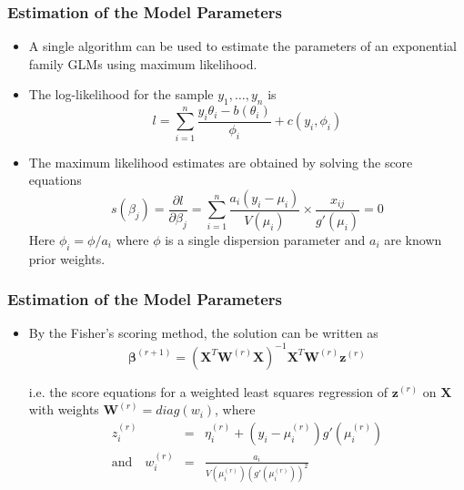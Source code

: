 \documentclass[10pt,xcolor={svgnames},t]{beamer}
\begin{document}
%
%
\begin{frame}
	\frametitle{Estimation of the Model Parameters}
	
	\begin{itemize}
		\item A single algorithm can be used to estimate the parameters of an exponential family GLMs using maximum likelihood.
				\bigskip
		\item The log-likelihood for the sample $y_1, \ldots , y_n$ is 
		\[ l=\sum_{i=1}^n \frac{y_i\theta_i - b(\theta_i )}{\phi_i}+c(y_i , \phi_i )
		\]
				\bigskip
		\item The maximum likelihood estimates are obtained by solving the score equations 
		\[ s(\beta_j )=\frac{\partial l}{\partial\beta_j} =\sum_{i=1}^n \frac{a_i(y_i -\mu_i)}{ V(\mu_i )}\times \frac{x_{ij}}{g'(\mu_i )}=0
		\]
		Here $\phi_i = \phi/a_i$ where $\phi$ is a single dispersion parameter and $a_i$ are known prior weights.
	\end{itemize}
	
	
\end{frame}
%
%
\begin{frame}
	\frametitle{Estimation of the Model Parameters}
	
	\begin{itemize}
		\item By the Fisher's scoring method, the solution can be written as 
		\[ \mathbf{\beta}^{(r+1)} = (\mathbf{X}^T \mathbf{W}^{(r)} \mathbf{X})^{-1} \mathbf{X}^T \mathbf{W}^{(r)} \mathbf{z}^{(r)}
		\]
	
		i.e. the score equations for a weighted least squares regression of $\mathbf{z}^{(r)}$ on $\mathbf{X}$ with weights $\mathbf{W}^{(r)}=diag(w_i )$, where
		\begin{eqnarray*}
			z_i^{(r)} &=& \eta_i^{(r)} + (y_i - \mu_i^{(r)} )g' (\mu_i^{(r)}) \\
			\text{and} \quad w_i^{(r)}&=&\frac{a_i}{V(\mu_i^{(r)})(g'(\mu_i^{(r)}))^2}
		\end{eqnarray*}
	\end{itemize}
	
	
\end{frame}
%
%
\end{document}
